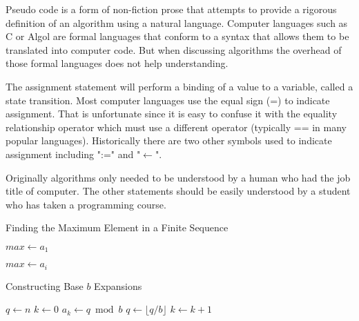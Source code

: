 \begin{definition}[PseudoCode]
Pseudo code is a form of non-fiction prose that attempts to provide a rigorous definition of an algorithm using a natural language. Computer languages such as C or Algol are formal languages that conform to a syntax that allows them to be translated into computer code. But when discussing algorithms the overhead of those formal languages does not help understanding. 

The assignment statement will perform a binding of a value to a variable, called a state transition. Most computer languages use the equal sign (=) to indicate assignment. That is unfortunate since it is easy to confuse it with the equality relationship  operator which must use a different operator (typically == in many popular languages). Historically there are two other symbols used to indicate assignment including ":=" and "$\leftarrow$". 

Originally algorithms only needed to be understood by a human who had the job title of computer. The other statements should be easily understood by a student who has taken a programming course. 
\end{definition}

\begin{algorithm}
\caption{Finding the Maximum Element in a Finite Sequence}\label{base b}
\begin{algorithmic}[1]
\State $max\gets a_1$
   
    \State $max\gets a_i$
    \EndIf
\EndFor\label{xxx} \\
\EndProcedure
\end{algorithmic}
\end{algorithm}




\begin{algorithm}
\caption{Constructing Base $b$ Expansions}\label{base b}
\begin{algorithmic}[1]
\State $q\gets n$
\State $k\gets 0$
\State $a_k\gets q \bmod b$
\State $q\gets \lfloor q/b\rfloor$
\State $k\gets k+1$
\EndWhile\label{xxx} \\
\EndProcedure
\end{algorithmic}
\end{algorithm}

